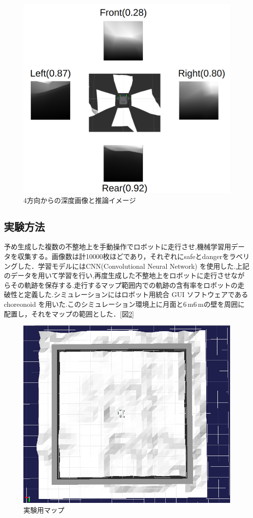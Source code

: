 \begin{figure}[htbp]
\begin{center}
  \includegraphics[width=0.6\linewidth]{images/planning.png}
  \caption{4方向からの深度画像と推論イメージ}
  \label{fig:planning}
\end{center}
\end{figure}

\subsection{実験方法}
予め生成した複数の不整地上を手動操作でロボットに走行させ,機械学習用データを収集する。画像数は計10000枚ほどであり，それぞれにsafeとdangerをラベリングした．学習モデルにはCNN(Convolutional Neural Network) を使用した.上記のデータを用いて学習を行い,再度生成した不整地上をロボットに走行させながらその軌跡を保存する.走行するマップ範囲内での軌跡の含有率をロボットの走破性と定義した.\cite{bunken2}シミュレーションにはロボット用統合 GUI ソフトウェアであるchoreonoid を用いた.このシミュレーション環境上に月面と$6 \mathrm{\,m}$\times$6\mathrm{\,m}$の壁を周囲に配置し，それをマップの範囲とした．[図\ref{fig:choreonoid}]

\begin{figure}[htbp]
  \begin{center}
   \includegraphics[width=0.5\linewidth]{images/choreonoid.png}
   \caption{実験用マップ}
   \label{fig:choreonoid}
  \end{center}
 \end{figure}


